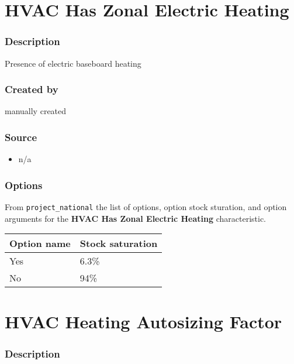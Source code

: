 \section{HVAC Has Zonal Electric
Heating}\label{hvac_has_zonal_electric_heating}

\subsubsection{Description}\label{description-69}

Presence of electric baseboard heating

\subsubsection{Created by}\label{created-by-69}

manually created

\subsubsection{Source}\label{source-68}

\begin{itemize}
 
\item
  n/a
\end{itemize}

\subsubsection{Options}\label{options-69}

From \texttt{project\_national} the list of options, option stock
sturation, and option arguments for the \textbf{HVAC Has Zonal Electric
Heating} characteristic.

\begin{longtable}[]{@{}ll@{}}
\toprule\noalign{}
Option name & Stock saturation \\
\midrule\noalign{}
\endhead
\bottomrule\noalign{}
\endlastfoot
Yes & 6.3\% \\
No & 94\% \\
\end{longtable}

\section{HVAC Heating Autosizing
Factor}\label{hvac_heating_autosizing_factor}

\subsubsection{Description}\label{description-70}

